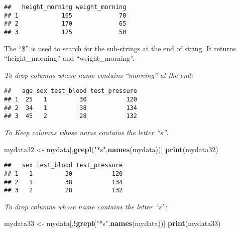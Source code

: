\documentclass[]{book}
\newenvironment{Shaded}{\begin{snugshade}}{\end{snugshade}}
\newcommand{\KeywordTok}[1]{\textcolor[rgb]{0.13,0.29,0.53}{\textbf{#1}}}
\newcommand{\StringTok}[1]{\textcolor[rgb]{0.31,0.60,0.02}{#1}}
\newcommand{\OperatorTok}[1]{\textcolor[rgb]{0.81,0.36,0.00}{\textbf{#1}}}
\newcommand{\NormalTok}[1]{#1}
\theoremstyle{definition}
\theoremstyle{definition}
\theoremstyle{definition}
\theoremstyle{remark}
\begin{document}
\begin{verbatim}
##   height_morning weight_morning
## 1            165             70
## 2            170             65
## 3            175             50
\end{verbatim}

The ``\$'' is used to search for the sub-strings at the end of string.
It returns ``height\_morning'' and ``weight\_morning''.

\emph{To drop columns whose name contains ``morning'' at the end:}

\begin{Shaded}
\end{Shaded}

\begin{verbatim}
##   age sex test_blood test_pressure
## 1  25   1         30           120
## 2  34   1         38           134
## 3  45   2         28           132
\end{verbatim}

\emph{To Keep columns whose name contains the letter ``s'':}

\begin{Shaded}
\begin{Highlighting}[]
\NormalTok{mydata32 <-}\StringTok{ }\NormalTok{mydata[,}\KeywordTok{grepl}\NormalTok{(}\StringTok{"*s"}\NormalTok{,}\KeywordTok{names}\NormalTok{(mydata))]}
\KeywordTok{print}\NormalTok{(mydata32)}
\end{Highlighting}
\end{Shaded}

\begin{verbatim}
##   sex test_blood test_pressure
## 1   1         30           120
## 2   1         38           134
## 3   2         28           132
\end{verbatim}

\emph{To drop columns whose name contains the letter ``s'':}

\begin{Shaded}
\begin{Highlighting}[]
\NormalTok{mydata33 <-}\StringTok{ }\NormalTok{mydata[,}\OperatorTok{!}\KeywordTok{grepl}\NormalTok{(}\StringTok{"*s"}\NormalTok{,}\KeywordTok{names}\NormalTok{(mydata))]}
\KeywordTok{print}\NormalTok{(mydata33)}
\end{Highlighting}
\end{Shaded}
\end{document}
